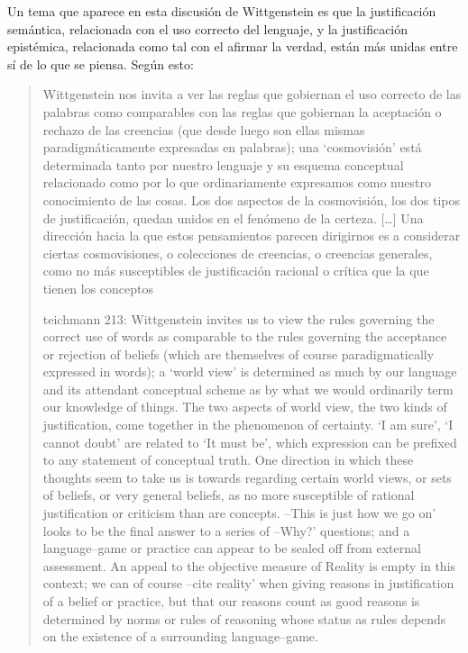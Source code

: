 Un tema que aparece en esta discusión de Wittgenstein es que la justificación
semántica, relacionada con el uso correcto del lenguaje, y la justificación
epistémica, relacionada como tal con el afirmar la verdad, están más unidas
entre sí de lo que se piensa. Según esto:\blockquote[teichmann 213: Wittgenstein
invites us to view the rules governing the correct use of words as comparable to
the rules governing the acceptance or rejection of beliefs (which are themselves
of course paradigmatically expressed in words); a ‘world view’ is determined as
much by our language and its attendant conceptual scheme as by what we would
ordinarily term our knowledge of things. The two aspects of world view, the two
kinds of justification, come together in the phenomenon of certainty. ‘I am
sure’, ‘I cannot doubt’ are related to ‘It must be’, which expression can be
prefixed to any statement of conceptual truth. One direction in which these
thoughts seem to take us is towards regarding certain world views, or sets of
beliefs, or very general beliefs, as no more susceptible of rational
justification or criticism than are concepts. –This is just how we go on’ looks
to be the final answer to a series of –Why?’ questions; and a language–game or
practice can appear to be sealed off from external assessment. An appeal to the
objective measure of Reality is empty in this context; we can of course –cite
reality’ when giving reasons in justification of a belief or practice, but that
our reasons count as good reasons is determined by norms or rules of reasoning
whose status as rules depends on the existence of a surrounding
language–game.]{Wittgenstein nos invita a ver las reglas que gobiernan el uso
  correcto de las palabras como comparables con las reglas que gobiernan la
  aceptación o rechazo de las creencias (que desde luego son ellas mismas
  paradigmáticamente expresadas en palabras); una `cosmovisión' está determinada
  tanto por nuestro lenguaje y su esquema conceptual relacionado como por lo que
  ordinariamente expresamos como nuestro conocimiento de las cosas. Los dos
  aspectos de la cosmovisión, los dos tipos de justificación, quedan unidos en
  el fenómeno de la certeza. [\ldots] Una dirección hacia la que estos
  pensamientos parecen dirigirnos es a considerar ciertas cosmovisiones, o
  colecciones de creencias, o creencias generales, como no más susceptibles de
  justificación racional o crítica que la que tienen los conceptos}.

